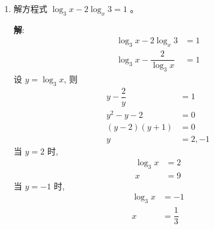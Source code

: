 \documentclass{report}
\newcommand{\sol}{\vspace{0.2cm}\textbf{解}:}
\begin{document}
\begin{multicols*}{2}
\begin{enumerate}[leftmargin=*]
              \sol{}
              \begin{align*}
                  \log_2 x^2 + \log_x 8           & = 5 \\
                  2\log_2 x + \dfrac{3}{\log_2 x} & = 5
              \end{align*}
              设 $y = \log_2 x$, 则
              \begin{align*}
                  2y + \dfrac{3}{y} & = 5               \\
                  2y^2 + 3          & = 5y              \\
                  2y^2 - 5y + 3     & = 0               \\
                  (2y - 3)(y - 1)   & = 0               \\
                  y                 & = \dfrac{3}{2}, 1
              \end{align*}
              当 $y = \dfrac{3}{2}$ 时,
              \begin{align*}
                  \log_2 x & = \dfrac{3}{2} \\
                  x        & = 2\sqrt{2}
              \end{align*}
              当 $y = 1$ 时,
              \begin{align*}
                  \log_2 x & = 1 \\
                  x        & = 2
              \end{align*}
              $\therefore x = 2\sqrt{2}$ 或 $x = 2$.

        \item 解方程式 $\log _3 x-2 \log _x 3=1$ 。

              \sol{}
              \begin{align*}
                  \log_3 x - 2 \log_x 3          & = 1 \\
                  \log_3 x - \dfrac{2}{\log_3 x} & = 1
              \end{align*}
              设 $y = \log_3 x$, 则
              \begin{align*}
                  y - \dfrac{2}{y} & = 1     \\
                  y^2 - y - 2      & = 0     \\
                  (y - 2)(y + 1)   & = 0     \\
                  y                & = 2, -1
              \end{align*}
              当 $y = 2$ 时,
              \begin{align*}
                  \log_3 x & = 2 \\
                  x        & = 9
              \end{align*}
              当 $y = -1$ 时,
              \begin{align*}
                  \log_3 x & = -1           \\
                  x        & = \dfrac{1}{3}
              \end{align*}


\end{enumerate}
\end{multicols*}
\end{document}
